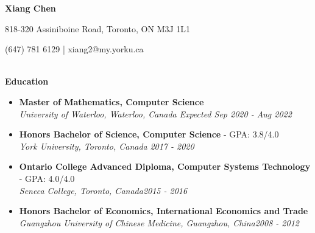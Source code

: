 \documentclass[a4paper,10pt,titlepage]{article}
\begin{document}
\centerline {\textbf {\LARGE Xiang Chen}}
\centerline {818-320 Assiniboine Road, Toronto, ON M3J 1L1}
\centerline {(647) 781 6129 \hspace*{1mm}|\hspace*{1mm} xiang2@my.yorku.ca}
\leftline{\rule{\linewidth}{0.1mm}}
~\\
\textbf {\Large Education}
\begin{itemize}%
	\item {\bf Master of Mathematics, Computer Science}
	\\\emph {University of Waterloo, Waterloo, Canada} {\hfill \emph{Expected Sep 2020 - Aug 2022}}
	\item {\bf Honors Bachelor of Science, Computer Science}     - GPA: 3.8/4.0
	\\\emph {York University, Toronto, Canada} {\hfill \emph{2017 - 2020}}
	\item {\bf Ontario College Advanced Diploma, Computer Systems Technology}     - GPA: 4.0/4.0
	\\\emph {Seneca College, Toronto, Canada}{\hfill \emph{2015 - 2016}}
	\item {\bf Honors Bachelor of Economics, International Economics and Trade}
	\\\emph  {Guangzhou University of Chinese Medicine, Guangzhou, China}{\hfill \emph{2008 - 2012}}
\end{itemize}
\end{document}
